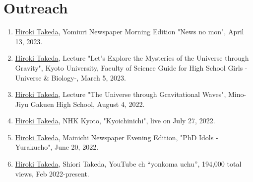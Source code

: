 \documentclass[uplatex, 12pt]{article}
\begin{document}
\section*{Outreach}

\begin{enumerate}
\item \uline{Hiroki Takeda}, Yomiuri Newspaper Morning Edition "News no mon", April 13, 2023.\\

\item \uline{Hiroki Takeda}, Lecture "Let's Explore the Mysteries of the Universe through Gravity", Kyoto University, Faculty of Science Guide for High School Girls -Universe \& Biology-,  March 5, 2023.\\

\item \uline{Hiroki Takeda}, Lecture "The Universe through Gravitational Waves", Mino-Jiyu Gakuen High School, August 4, 2022.

\item \uline{Hiroki Takeda}, NHK Kyoto, "Kyoichinichi", live on July 27, 2022.\\

\item \uline{Hiroki Takeda}, Mainichi Newspaper Evening Edition, "PhD Idols - Yurakucho", June 20, 2022.\\

\item \uline{Hiroki Takeda}, Shiori Takeda, YouTube ch “yonkoma uchu”,  194,000 total views, Feb 2022-present.\\

\end{enumerate}
\end{document}
